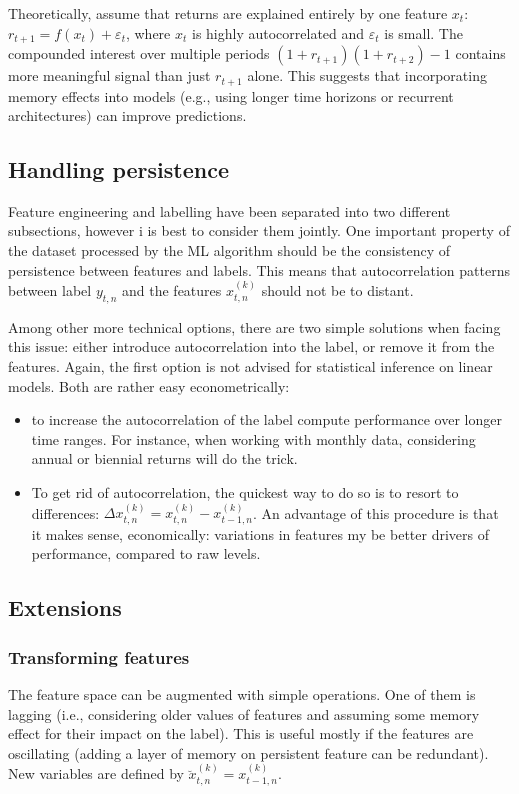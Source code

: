 Theoretically, assume that returns are explained entirely by one feature $x_{t}$: $r_{t+1} = f(x_{t}) + \varepsilon_{t}$, where $x_{t}$ is highly autocorrelated and $\varepsilon_{t}$ is small. The compounded interest over multiple periods $(1 + r_{t+1}) (1 + r_{t+2}) - 1$ contains more meaningful signal than just $r_{t+1}$ alone. This suggests that incorporating memory effects into models (e.g., using longer time horizons or recurrent architectures) can improve predictions.

\subsection{Handling persistence}
Feature engineering and labelling have been separated into two different subsections, however i is best to consider them jointly. One important property of the dataset processed by the ML algorithm should be the consistency of persistence between features and labels. This means that autocorrelation patterns between label $y_{t,n}$ and the features $x_{t,n}^{(k)}$ should not be to distant.

Among other more technical options, there are two simple solutions when facing this issue: either introduce autocorrelation into the label, or remove it from the features. Again, the first option is not advised for statistical inference on linear models. Both are rather easy econometrically:
\begin{itemize}
    \item to increase the autocorrelation of the label compute performance over longer time ranges. For instance, when working with monthly data, considering annual or biennial returns will do the trick.
    \item To get rid of autocorrelation, the quickest way to do so is to resort to differences: $\Delta x_{t,n}^{(k)} = x_{t,n}^{(k)} - x_{t-1,n}^{(k)} $. An advantage of this procedure is that it makes sense, economically: variations in features my be better drivers of performance, compared to raw levels.
\end{itemize}

\subsection{Extensions}
\subsubsection{Transforming features}
The feature space can be augmented with simple operations. One of them is lagging (i.e., considering older values of features and assuming some memory effect for their impact on the label). This is useful mostly if the features are oscillating (adding a layer of memory on persistent feature can be redundant). New variables are defined by $\breve{x}_{t,n}^{(k)} = x_{t-1,n}^{(k)}$. 

